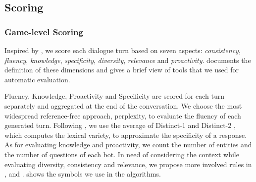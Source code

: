 \subsection{Scoring}
\label{sec:scoring}
\subsubsection{Game-level Scoring}

Inspired by \citet{finch-choi-2020-towards}, 
we score each dialogue turn based on seven aspects: 
\textit{consistency}, \textit{fluency}, \textit{knowledge}, \textit{specificity}, 
\textit{diversity}, \textit{relevance} and \textit{proactivity}.
 documents the definition of these dimensions
and 
gives a brief view of tools that
we used for automatic evaluation. 




 
Fluency, Knowledge, Proactivity and Specificity are scored for each turn separately
and aggregated at the end of the conversation. 
We choose the most widespread reference-free approach, 
perplexity, to evaluate the fluency
of each generated turn.
Following \citet{bao-etal-2021-plato}, 
we use the average of Distinct-1 and Distinct-2 \citep{li-etal-2016-diversity},
which computes the lexical variety, to approximate the specificity of a response.
As for evaluating knowledge and proactivity, we
count the number of entities and the number of questions of each bot.
In need of considering the context while evaluating diversity, consistency and relevance,
we propose more involved rules in , 
 and .
 shows the symbols we use in the algorithms.

